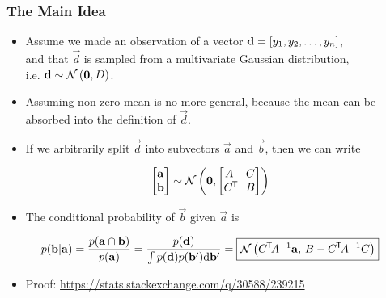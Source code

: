 \begin{frame} \frametitle{The Main Idea}
\begin{itemize}
  \item Assume we made an observation of a vector
    $\vec{d} = [y_1,y_2,\mathellipsis,y_n]$,\\
    and that $\vec{d}$ is sampled from a multivariate Gaussian
    distribution,\\i.e. $\vec{d}\sim\N{\vec{0},D}$.
  \vspace{1mm}
  \item Assuming non-zero mean is no more general, because the mean can be
    absorbed into the definition of $\vec{d}$.
  \vspace{1mm}
  \item If we arbitrarily split $\vec{d}$ into subvectors
    $\vec{a}$ and $\vec{b}$, then we can write
\end{itemize}
\begin{equation}\label{eq:n1}
  \begin{bmatrix} \vec{a} \\ \vec{b} \end{bmatrix} \sim
    \N{\vec{0},\begin{bmatrix} A & C \\ C\T\!\! & B \end{bmatrix}}
\end{equation}
\begin{itemize}
  \item The conditional probability of $\vec{b}$ given $\vec{a}$ is
\end{itemize}
\vspace{1mm}
\begin{equation}
  p(\vec{b}|\vec{a})
  = \frac{p(\vec{a}\cap\vec{b})}{p(\vec{a})}
  = \frac{p(\vec{d})}{\int p(\vec{d})p(\vec{b}') \mathrm{d}\vec{b}'}
  = \boxed{ \N{C\T\!A^{-1}\vec{a},\,B-C\T\!A^{-1}C} }
\end{equation}
\vspace{-5mm}
\begin{itemize}
  \item Proof: {\small\url{https://stats.stackexchange.com/q/30588/239215}}
\end{itemize}
\end{frame}

